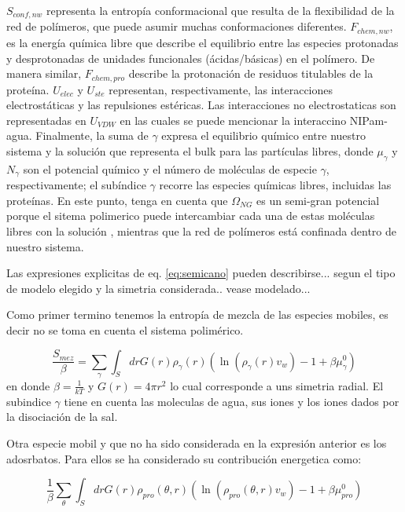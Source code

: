 $S_{conf,nw}$ representa la entropía conformacional que resulta de la flexibilidad de la red de polímeros, que puede asumir muchas conformaciones diferentes.
$F_{chem,nw}$, es la energía química libre que describe el equilibrio entre las especies protonadas y desprotonadas de unidades funcionales (ácidas/básicas) en el polímero.
De manera similar, $F_{chem,pro}$ describe la protonación de residuos titulables de la proteína.
$U_{elec}$ y $U_{ste}$ representan, respectivamente, las interacciones electrostáticas y las repulsiones estéricas.
Las interacciones no electrostaticas son representadas en $U_{VDW}$ en las cuales se puede mencionar la interaccino NIPam-agua.
Finalmente, la suma de $\gamma$ expresa el equilibrio químico entre nuestro sistema y la solución  que representa el bulk para las partículas libres, donde $\mu_\gamma$ y $N_\gamma$ son el potencial químico y el número de moléculas de especie $\gamma$, respectivamente;
el subíndice $\gamma$ recorre las especies químicas libres, incluidas las proteínas.
En este punto, tenga en cuenta que $\Omega_{NG}$ es un semi-gran potencial porque el sitema polimerico puede intercambiar cada una de estas moléculas libres con la solución , mientras que la red de polímeros está confinada dentro de nuestro sistema.

Las expresiones explicitas de eq. \ref{eq:semicano} pueden describirse... segun el tipo de modelo elegido y la simetria considerada.. vease modelado...

Como primer termino tenemos la entrop\'ia de mezcla de  las especies mobiles, es decir no se toma en cuenta el sistema polim\'erico.

\begin{equation}
   \frac{S_{mez}}{\beta}= \sum_{\gamma}\int_S{dr G(r)\rho_\gamma(r)\left(\ln \left(\rho_\gamma (r)v_w\right) -1 + \beta\mu^0_\gamma\right)}
\end{equation}
\noindent en donde $\beta = \frac{1}{kT}$ y $G(r) = 4\pi r^2$ lo cual corresponde a uns simetria radial. El subindice $\gamma$ tiene en cuenta las moleculas de agua, sus iones y los iones dados por la disociaci\'on de la sal.

Otra especie mobil y que no ha sido considerada en la expresi\'on anterior es los adosrbatos. Para ellos se ha considerado su contribuci\'on energetica como:

\begin{equation}
    \frac{1}{\beta}\sum_{\theta}\int_S{dr G(r)\rho_{pro}(\theta,r)\left(\ln \left(\rho_{pro}(\theta,r)v_w\right) -1 + \beta\mu^0_{pro} \right)}
\end{equation}

